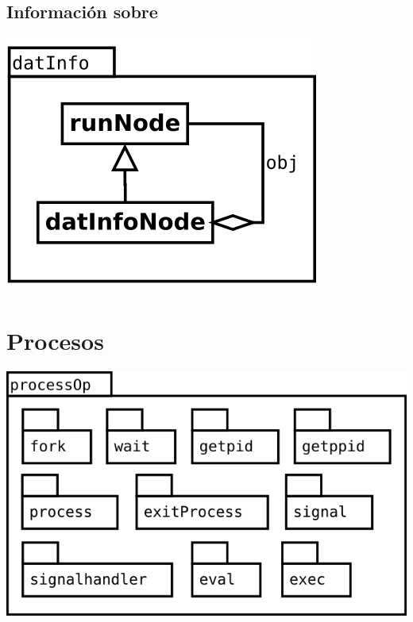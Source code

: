 \subsection {Información sobre} 
\begin{center}
\includegraphics[scale=0.4]{datInfo.png} \\
\end{center}

\pagebreak
\section {Procesos} 
\begin{center}
\includegraphics[scale=0.4]{processOp-package.png} \\
\end{center}

